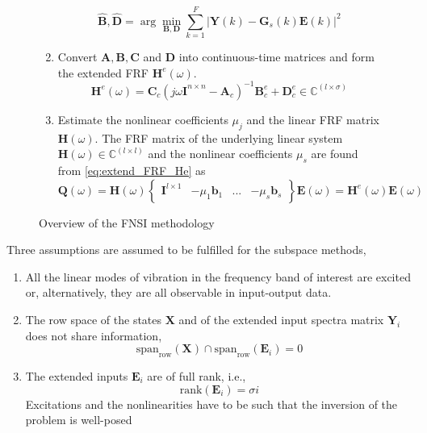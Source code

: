 \begin{figure}[!ht]
\begin{mdframed}
\begin{enumerate}
\begin{equation*}
        \hat {\bm B}, \hat {\bm D} = \arg \min_{\bm B, \bm D} \sum_{k=1}^F |\bm Y(k) - \bm G_s(k) \bm E(k)|^2
      \end{equation*}
    \item Convert $\bm A, \bm B, \bm C$ and $\bm D$ into continuous-time
      matrices and form the extended FRF $\bm H^e(\omega)$.
      \begin{equation}
        \label{eq:extend_FRF_He}
        \bm H^e(\omega) = \bm C_c \left(j \omega \bm I^{n \times n} - \bm A_c \right)^{-1} \bm B_c^e + \bm D_c^e
        \in \mathbb{C}^{(l \times \sigma)}
      \end{equation}
    \item Estimate the nonlinear coefficients $\mu_j$ and the linear FRF matrix
      $\bm H(\omega)$.
      The FRF matrix of the underlying linear system $\bm H(\omega) \in \mathbb{C}^{(l
        \times l)}$ and the nonlinear coefficients $\mu_s$ are found from
      \eqref{eq:extend_FRF_He} as
      \begin{equation}
        \label{eq:FRE_H}
        \bm Q(\omega) = \bm H(\omega)
        \begin{Bmatrix}
          \bm I^{l\times 1} & -\mu_1\bm b_1 & ... & -\mu_s \bm b_s
        \end{Bmatrix}
        \bm E (\omega)
        =
        \bm H^e(\omega) \bm E(\omega)
      \end{equation}
    \end{enumerate}
  \end{mdframed}
  \caption{Overview of the FNSI methodology}
  \label{fig:fnsi_methodolgoy}
\end{figure}



Three assumptions are assumed to be fulfilled for the subspace methods,
\begin{enumerate}
\item All the linear modes of vibration in the frequency band of interest are
  excited or, alternatively, they are all observable in input-output data.
\item The row space of the states $\bm X$ and of the extended input spectra
  matrix $\bm Y_i$ does not share information,
  \begin{equation*}
    \text{span}_{\text{row}} (\bm X) \cap \text{span}_{\text{row}}(\bm E_i) = 0
  \end{equation*}
\item The extended inputs $\bm E_i$ are of full rank, i.e.,
  \begin{equation*}
    \text{rank}(\bm E_i) = \sigma i
  \end{equation*}
  Excitations and the nonlinearities have to be such that the inversion of the
  problem is well-posed
\end{enumerate}

